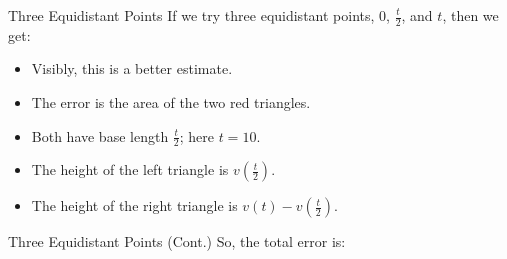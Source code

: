 \documentclass[Lecture.tex]{subfiles}
\begin{document}
\begin{frame}{Three Equidistant Points}
  If we try three equidistant points, 0, $\frac{t}{2}$, and $t$, then we get:\\
  \vfill
  \begin{minipage}{0.48\linewidth}
  \end{minipage}
  \hfill
  \begin{minipage}{0.48\linewidth}
    \begin{itemize}
    \item<3->
      Visibly, this is a better estimate.
    \item<4->
      The error is the area of the two red triangles.
    \item<5->
      Both have base length $\frac{t}{2}$; here $t = 10$.
    \item<6->
      The height of the left triangle is $v\left(\frac{t}{2}\right)$.
    \item<7->
      The height of the right triangle is $v(t) - v\left(\frac{t}{2}\right)$.
    \end{itemize}
  \end{minipage}
\end{frame}

\begin{frame}{Three Equidistant Points (Cont.)}
  So, the total error is:\\
\end{frame}
\end{document}
